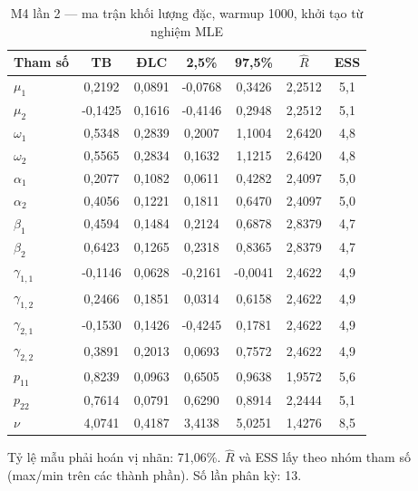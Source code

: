 \documentclass[11pt,a4paper]{article}
\begin{document}
\begin{table}[H]\centering\footnotesize
\caption{M4 lần 2 --- ma trận khối lượng đặc, warmup 1000, khởi tạo từ nghiệm MLE}
\begin{tabularx}{\textwidth}{l C C C C C C}
\toprule
\textbf{Tham số} & \textbf{TB} & \textbf{ĐLC} & \textbf{2,5\%} & \textbf{97,5\%} & $\widehat{R}$ & \textbf{ESS} \\
\midrule
$\mu_1$ & 0{,}2192 & 0{,}0891 & -0{,}0768 & 0{,}3426 & 2{,}2512 & 5{,}1 \\
$\mu_2$ & -0{,}1425 & 0{,}1616 & -0{,}4146 & 0{,}2948 & 2{,}2512 & 5{,}1 \\
$\omega_1$ & 0{,}5348 & 0{,}2839 & 0{,}2007 & 1{,}1004 & 2{,}6420 & 4{,}8 \\
$\omega_2$ & 0{,}5565 & 0{,}2834 & 0{,}1632 & 1{,}1215 & 2{,}6420 & 4{,}8 \\
$\alpha_1$ & 0{,}2077 & 0{,}1082 & 0{,}0611 & 0{,}4282 & 2{,}4097 & 5{,}0 \\
$\alpha_2$ & 0{,}4056 & 0{,}1221 & 0{,}1811 & 0{,}6470 & 2{,}4097 & 5{,}0 \\
$\beta_1$ & 0{,}4594 & 0{,}1484 & 0{,}2124 & 0{,}6878 & 2{,}8379 & 4{,}7 \\
$\beta_2$ & 0{,}6423 & 0{,}1265 & 0{,}2318 & 0{,}8365 & 2{,}8379 & 4{,}7 \\
$\gamma_{1,1}$ & -0{,}1146 & 0{,}0628 & -0{,}2161 & -0{,}0041 & 2{,}4622 & 4{,}9 \\
$\gamma_{1,2}$ & 0{,}2466 & 0{,}1851 & 0{,}0314 & 0{,}6158 & 2{,}4622 & 4{,}9 \\
$\gamma_{2,1}$ & -0{,}1530 & 0{,}1426 & -0{,}4245 & 0{,}1781 & 2{,}4622 & 4{,}9 \\
$\gamma_{2,2}$ & 0{,}3891 & 0{,}2013 & 0{,}0693 & 0{,}7572 & 2{,}4622 & 4{,}9 \\
$p_{11}$ & 0{,}8239 & 0{,}0963 & 0{,}6505 & 0{,}9638 & 1{,}9572 & 5{,}6 \\
$p_{22}$ & 0{,}7614 & 0{,}0791 & 0{,}6290 & 0{,}8914 & 2{,}2444 & 5{,}1 \\
$\nu$ & 4{,}0741 & 0{,}4187 & 3{,}4138 & 5{,}0251 & 1{,}4276 & 8{,}5 \\
\bottomrule
\end{tabularx}
\begin{tablenotes}\footnotesize\item Tỷ lệ mẫu phải hoán vị nhãn: 71{,}06\%. $\widehat{R}$ và ESS lấy theo nhóm tham số (max/min trên các thành phần). Số lần phân kỳ: 13.\end{tablenotes}
\end{table}
\end{document}
